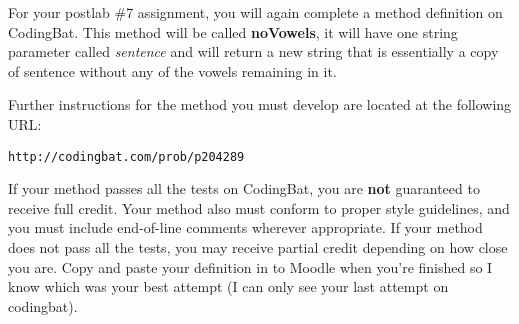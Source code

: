 For your postlab \#7 assignment, you will again complete a method definition on CodingBat. This method will be called \textbf{noVowels}, it will have one string parameter called \textit{sentence} and will return a new string that is essentially a copy of sentence without any of the vowels remaining in it.

Further instructions for the method you must develop are located at the following URL:

\begin{verbatim}
http://codingbat.com/prob/p204289
\end{verbatim}

If your method passes all the tests on CodingBat, you are \textbf{not} guaranteed to receive full credit. Your method also must conform to proper style guidelines, and you must include end-of-line comments wherever appropriate. If your method does not pass all the tests, you may receive partial credit depending on how close you are. Copy and paste your definition in to Moodle when you're finished so I know which was your best attempt (I can only see your last attempt on codingbat). 

